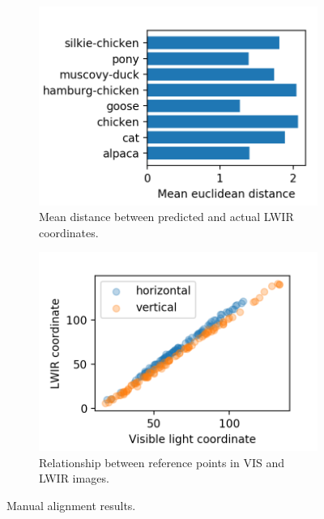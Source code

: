 \documentclass{l4proj}
\begin{document}
\begin{figure}[ht]
  \centering
  \begin{subfigure}[h!]{0.45\textwidth}
    \includegraphics[width=\textwidth]{images/registration/error.png}
    \caption{Mean distance between predicted and actual LWIR coordinates.}
    \label{fig:registration_error}
  \end{subfigure}
  \begin{subfigure}[h!]{0.45\textwidth}
    \includegraphics[width=\textwidth]{images/registration/x_y.png}
    \caption{Relationship between reference points in VIS and LWIR images.}
    \label{fig:registration_relationship}
  \end{subfigure}
  \caption{Manual alignment results.}
\end{figure}
\end{document}
